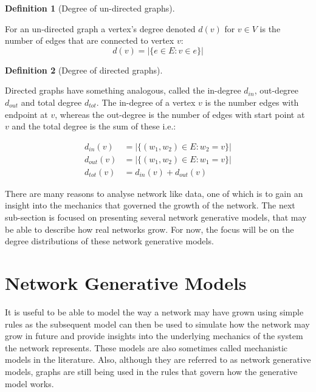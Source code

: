 \documentclass[
  10pt,
  a4paper,
]{scrreprt}
\theoremstyle{plain}
\theoremstyle{definition}
\newtheorem{definition}{Definition}[section]
\theoremstyle{remark}
\begin{document}
{\begin{definition}[Degree of un-directed
graphs]\protect\hypertarget{def-deg}{}\label{def-deg}

For an un-directed graph a vertex's degree denoted \(d(v)\) for
\(v\in V\) is the number of edges that are connected to vertex \(v\): \[
d(v) = |\{e\in E : v \in e\}|
\]

\end{definition}

\begin{definition}[Degree of directed
graphs]\protect\hypertarget{def-dirdeg}{}\label{def-dirdeg}

Directed graphs have something analogous, called the in-degree
\(d_{in}\), out-degree \(d_{out}\) and total degree \(d_{tot}\). The
in-degree of a vertex \(v\) is the number edges with endpoint at \(v\),
whereas the out-degree is the number of edges with start point at \(v\)
and the total degree is the sum of these i.e.:

\begin{align*}
d_{in}(v)&= |\{(w_1,w_2)\in E: w_2=v \}|\\
d_{out}(v) &= |\{(w_1,w_2)\in E: w_1=v \}|\\
d_{tot}(v) &= d_{in}(v) + d_{out}(v)
\end{align*}

\end{definition}

There are many reasons to analyse network like data, one of which is to
gain an insight into the mechanics that governed the growth of the
network. The next sub-section is focused on presenting several network
generative models, that may be able to describe how real networks grow.
For now, the focus will be on the degree distributions of these network
generative models.

\hypertarget{sec-gen}{%
\section{Network Generative Models}\label{sec-gen}}

It is useful to be able to model the way a network may have grown using
simple rules as the subsequent model can then be used to simulate how
the network may grow in future and provide insights into the underlying
mechanics of the system the network represents. These models are also
sometimes called mechanistic models in the literature. Also, although
they are referred to as network generative models, graphs are still
being used in the rules that govern how the generative model works.

}
\end{document}
